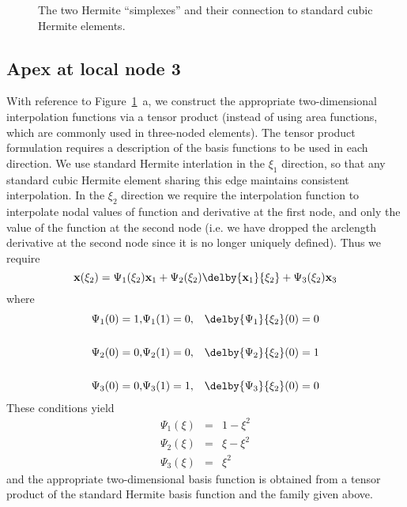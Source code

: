 \begin{figure}
\centering
 
 \caption[The two Hermite ``simplexes'']{The two Hermite ``simplexes'' and their connection to standard cubic Hermite 
elements.}
\label{fig:B1}
\end{figure}

\subsection{Apex at local node 3}
With reference to Figure~\ref{fig:B1}~a, we construct the appropriate
two-dimensional interpolation functions via a tensor product (instead of using
area functions, which are commonly used in three-noded elements).  The tensor
product formulation requires a description of the basis functions to be used
in each direction.  We use standard Hermite interlation in the $\xi_{1}$
direction, so that any standard cubic Hermite element sharing this edge
maintains consistent interpolation.  In the $\xi_{2}$ direction we require the
interpolation function to interpolate nodal values of function and derivative
at the first node, and only the value of the function at the second node (i.e.
we have dropped the arclength derivative at the second node since it is no
longer uniquely defined).  Thus we require
\begin{displaymath}
 {\bf x}(\xi_{2}) = \Psi_{1}(\xi_{2}){\bf x}_{1} + \Psi_{2}(\xi_{2}) 
  \delby{{\bf x}_{1}}{\xi_{2}}  + \Psi_{3}(\xi_{2}) {\bf x}_{3}
\end{displaymath}  
where   
\begin{eqnarray*}
 \Psi_{1} (0)  = 1,&\Psi_{1} (1)=0,&\delby{\Psi_{1}}{\xi_{2}} (0) = 0\\  \\
 \Psi_{2} (0)  = 0,&\Psi_{2} (1)=0,&\delby{\Psi_{2}}{\xi_{2}}(0) = 1\\
 \\  
 \Psi_{3} (0)  = 0,&\Psi_{3} (1)=1,&\delby{\Psi_{3}}{\xi_{2}} (0) = 0
\end{eqnarray*}  
These conditions yield
\begin{eqnarray*}
 \Psi_{1} (\xi) & = & 1 - \xi^{2}\\ 
 \Psi_{2} (\xi) & = & \xi - \xi^{2}\\ 
 \Psi_{3} (\xi) & = & \xi^{2}
\end{eqnarray*} 
and the appropriate two-dimensional basis function is obtained from a tensor
product of the standard Hermite basis function and the family given above.

